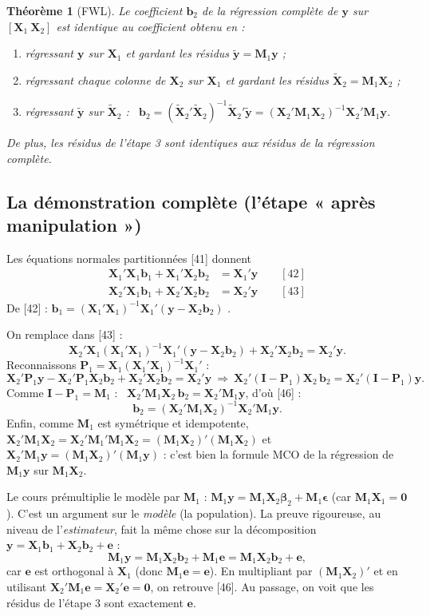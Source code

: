 \documentclass[11pt,a4paper]{article}
\newcommand{\vy}{\mathbf{y}}
\newcommand{\vX}{\mathbf{X}}
\newcommand{\ve}{\mathbf{e}}
\newcommand{\vb}{\mathbf{b}}
\newcommand{\vbeta}{\bm{\beta}}
\newcommand{\veps}{\bm{\epsilon}}
\newcommand{\Mm}{\mathbf{M}}
\newcommand{\Pm}{\mathbf{P}}
\newcommand{\I}{\mathbf{I}}
\newtheorem*{theoreme}{Théorème}
\begin{document}
\begin{theoreme}[FWL]
Le coefficient $\vb_2$ de la régression complète de $\vy$ sur $[\vX_1\ \vX_2]$ est identique au coefficient obtenu en :
\begin{enumerate}[nosep]
\item régressant $\vy$ sur $\vX_1$ et gardant les résidus $\tilde{\vy}=\Mm_1\vy$ ;
\item régressant chaque colonne de $\vX_2$ sur $\vX_1$ et gardant les résidus $\tilde{\vX}_2=\Mm_1\vX_2$ ;
\item régressant $\tilde{\vy}$ sur $\tilde{\vX}_2$ :
\ $\vb_2=(\tilde{\vX}_2'\tilde{\vX}_2)^{-1}\tilde{\vX}_2'\tilde{\vy}=(\vX_2'\Mm_1\vX_2)^{-1}\vX_2'\Mm_1\vy$.
\end{enumerate}
De plus, les résidus de l'étape 3 sont identiques aux résidus de la régression complète.
\end{theoreme}

\subsection{La démonstration complète (l'étape « après manipulation »)}
\begin{detail}
Les équations normales partitionnées [41] donnent
\begin{align*}
\vX_1'\vX_1\vb_1+\vX_1'\vX_2\vb_2&=\vX_1'\vy \qquad [42]\\
\vX_2'\vX_1\vb_1+\vX_2'\vX_2\vb_2&=\vX_2'\vy \qquad [43]
\end{align*}
De [42] : $\vb_1=(\vX_1'\vX_1)^{-1}\vX_1'(\vy-\vX_2\vb_2)$ \quad [45].

On remplace dans [43] :
\[
\vX_2'\vX_1(\vX_1'\vX_1)^{-1}\vX_1'(\vy-\vX_2\vb_2)+\vX_2'\vX_2\vb_2=\vX_2'\vy .
\]
Reconnaissons $\Pm_1=\vX_1(\vX_1'\vX_1)^{-1}\vX_1'$ :
\[
\vX_2'\Pm_1\vy-\vX_2'\Pm_1\vX_2\vb_2+\vX_2'\vX_2\vb_2=\vX_2'\vy
\ \Longrightarrow\
\vX_2'(\I-\Pm_1)\vX_2\,\vb_2=\vX_2'(\I-\Pm_1)\vy .
\]
Comme $\I-\Pm_1=\Mm_1$ : \ $\vX_2'\Mm_1\vX_2\,\vb_2=\vX_2'\Mm_1\vy$, d'où [46] :
\[
\vb_2=(\vX_2'\Mm_1\vX_2)^{-1}\vX_2'\Mm_1\vy .
\]
Enfin, comme $\Mm_1$ est symétrique et idempotente, $\vX_2'\Mm_1\vX_2=\vX_2'\Mm_1'\Mm_1\vX_2=(\Mm_1\vX_2)'(\Mm_1\vX_2)$ et $\vX_2'\Mm_1\vy=(\Mm_1\vX_2)'(\Mm_1\vy)$ : c'est bien la formule MCO de la régression de $\Mm_1\vy$ sur $\Mm_1\vX_2$.
\end{detail}

\begin{detail}[title={Remarque sur la seconde preuve du cours [47]--[49]}]
Le cours prémultiplie le modèle par $\Mm_1$ : $\Mm_1\vy=\Mm_1\vX_2\vbeta_2+\Mm_1\veps$ (car $\Mm_1\vX_1=\mathbf 0$). C'est un argument sur le \emph{modèle} (la population). La preuve rigoureuse, au niveau de l'\emph{estimateur}, fait la même chose sur la décomposition $\vy=\vX_1\vb_1+\vX_2\vb_2+\ve$ :
\[
\Mm_1\vy=\Mm_1\vX_2\vb_2+\Mm_1\ve=\Mm_1\vX_2\vb_2+\ve ,
\]
car $\ve$ est orthogonal à $\vX_1$ (donc $\Mm_1\ve=\ve$). En multipliant par $(\Mm_1\vX_2)'$ et en utilisant $\vX_2'\Mm_1\ve=\vX_2'\ve=\mathbf 0$, on retrouve [46]. Au passage, on voit que les résidus de l'étape 3 sont exactement $\ve$.
\end{detail}
\end{document}
